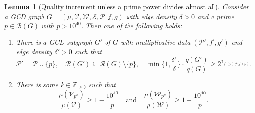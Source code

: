 \documentclass[12pt]{amsart}
\numberwithin{equation}{section}
\newtheorem{lem}{Lemma}[section]
\theoremstyle{definition}
\theoremstyle{remark}
\newcommand{\Z}{\mathbb{Z}}
\newcommand{\CE}{\mathcal{E}}
\newcommand{\CP}{\mathcal{P}}
\newcommand{\CR}{\mathcal{R}}
\newcommand{\CV}{\mathcal{V}}
\newcommand{\CW}{\mathcal{W}}
\newcommand{\un}{\mathds{1}}
\renewcommand{\ge}{\geqslant}
\begin{document}
\begin{lem}[Quality increment unless a prime power divides almost all]\label{lem:MainLem}
Consider a GCD graph $G=(\mu,\CV,\CW,\CE,\CP,f,g)$ with edge density $\delta>0$ and a prime $p\in\CR(G)$ with $p>10^{40}$. Then one of the following holds:
\begin{enumerate}
\item There is a GCD subgraph $G'$ of $G$ with multiplicative data $(\CP',f',g')$ and edge density $\delta'>0$ such that
\[
\CP'=\CP\cup\{p\},\quad
\CR(G')\subseteq \CR(G)\setminus\{p\},\quad 
\min\bigg\{1,\frac{\delta'}{\delta}\bigg\}
	\cdot \frac{q(G')}{q(G)} \ge 2^{\un_{f'(p)\neq g'(p)}} .
\]
\item There is some $k\in\Z_{\ge0}$ such that
\[
\frac{\mu(\CV_{p^k})}{\mu(\CV)}\ge1-\frac{10^{40}}{p}
\quad\text{and}\quad
\frac{\mu(\CW_{p^k})}{\mu(\CW)}\ge 1-\frac{10^{40}}{p}.
\]
\end{enumerate}
\end{lem}
\end{document}
